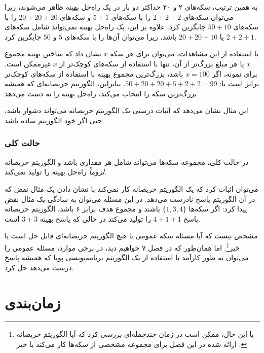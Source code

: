 به همین ترتیب، سکه‌های ۲ و ۲۰
حداکثر دو بار در یک راه‌حل بهینه ظاهر می‌شوند،
زیرا می‌توان سکه‌های $2+2+2$ را با سکه‌های $5+1$ و
سکه‌های $20+20+20$ را با سکه‌های $50+10$ جایگزین کرد.
علاوه بر این، یک راه‌حل بهینه نمی‌تواند شامل
سکه‌های $2+2+1$ یا $20+20+10$ باشد،
زیرا می‌توان آن‌ها را با سکه‌های $5$ و $50$ جایگزین کرد.

با استفاده از این مشاهدات،
می‌توان برای هر سکه $x$ نشان داد که
ساختن بهینه مجموع $x$ یا هر مبلغ بزرگ‌تر از آن،
تنها با استفاده از سکه‌های کوچک‌تر از $x$ غیرممکن است.
برای نمونه، اگر $x=100$ باشد، بزرگ‌ترین مجموع بهینه
با استفاده از سکه‌های کوچک‌تر برابر است با: $50+20+20+5+2+2=99$.
بنابراین، الگوریتم حریصانه‌ای که همیشه بزرگ‌ترین سکه را انتخاب می‌کند،
راه‌حل بهینه را به دست می‌دهد.

این مثال نشان می‌دهد که اثبات درستی یک الگوریتم حریصانه
می‌تواند دشوار باشد، حتی اگر خود الگوریتم ساده باشد.

\subsubsection{حالت کلی}

در حالت کلی، مجموعه سکه‌ها می‌تواند شامل هر مقداری باشد
و الگوریتم حریصانه \emph{لزوماً} راه‌حل بهینه را تولید نمی‌کند.

می‌توان اثبات کرد که یک الگوریتم حریصانه کار نمی‌کند
با نشان دادن یک مثال نقض
که در آن الگوریتم پاسخ نادرست می‌دهد.
در این مسئله می‌توان به سادگی یک مثال نقض پیدا کرد:
اگر سکه‌ها $\{1,3,4\}$ باشند و مجموع هدف
برابر ۶ باشد، الگوریتم حریصانه پاسخ
$4+1+1$ را تولید می‌کند در حالی که پاسخ بهینه $3+3$ است.

مشخص نیست که آیا مسئله سکه عمومی
با هیچ الگوریتم حریصانه‌ای قابل حل است یا خیر\footnote{با این حال، ممکن است
در زمان چندجمله‌ای \emph{بررسی} کرد
که آیا الگوریتم حریصانه ارائه شده در این فصل برای
مجموعه مشخصی از سکه‌ها کار می‌کند یا خیر \cite{pea05}.}.
اما همان‌طور که در فصل ۷ خواهیم دید،
در برخی موارد،
مسئله عمومی را می‌توان به طور کارآمد
با استفاده از یک الگوریتم برنامه‌نویسی پویا
که همیشه پاسخ درست می‌دهد حل کرد.

\section{زمان‌بندی}

